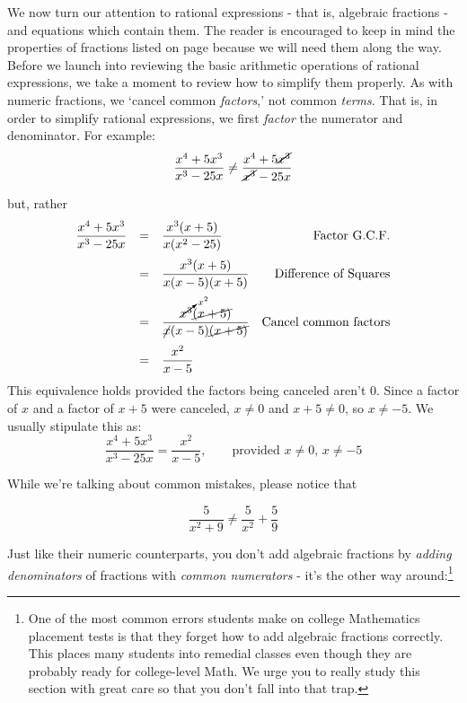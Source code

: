 \documentclass{ximera}
\begin{document}
	\author{Stitz-Zeager}




\setcounter{footnote}{0}

\label{AppRatExpEqus}

We now turn our attention to rational expressions - that is, algebraic fractions - and equations which contain them.  The reader is encouraged to keep in mind the properties of fractions listed on page \pageref{fractionarithmetic} because we will need them along the way.  Before we launch into reviewing the basic arithmetic operations of rational expressions, we take a moment to review how to simplify them properly.  As with numeric fractions, we `cancel common \textit{factors},' not common \textit{terms}.  That is, in order to simplify rational expressions, we first \textit{factor} the numerator and denominator.  For example:  \[ \dfrac{x^4 + 5x^3}{x^3 - 25x} \neq \dfrac{x^4 + 5\cancel{x^3}}{\cancel{x^3} - 25x} \]

but, rather \[ \begin{array}{rclr}

\dfrac{x^4 + 5x^3}{x^3 - 25x} & = & \dfrac{x^3(x + 5)}{x(x^2-25)} & \text{Factor G.C.F.} \\ [12pt]
                             & = & \dfrac{x^3(x + 5)}{x(x-5)(x+5)} & \text{Difference of Squares} \\ [12pt]
														& = & \dfrac{\cancelto{x^2}{x^3}\cancel{(x + 5)}}{\cancel{x}(x-5)\cancel{(x+5)}} & \text{Cancel common factors}\\ [12pt]                         
														& = & \dfrac{x^2}{x-5} & \\ \end{array}\] This equivalence holds provided the factors being canceled aren't $0$. Since a factor of $x$ and a factor of $x+5$ were canceled, $x \neq 0$ and $x+5 \neq 0$, so $x \neq -5$.   We usually stipulate this as: \[ \dfrac{x^4 + 5x^3}{x^3 - 25x}  = \dfrac{x^2}{x-5}, \qquad \text{provided $x \neq 0$, $x \neq -5$} \]

While we're talking about common mistakes, please notice that 

\[ \dfrac{5}{x^2+9} \neq \dfrac{5}{x^2} + \dfrac{5}{9} \] 

Just like their numeric counterparts, you don't add algebraic fractions by \textit{adding denominators} of fractions with \textit{common numerators} - it's the other way around:\footnote{One of the most common errors students make on college Mathematics placement tests is that they forget how to add algebraic fractions correctly.  This places many students into remedial classes even though they are probably ready for college-level Math.  We urge you to really study this section with great care so that you don't fall into that trap.} 
\end{document}
